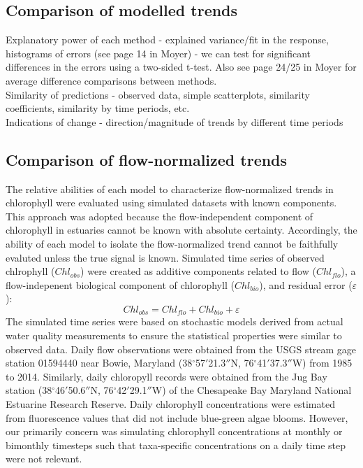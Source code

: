 \documentclass[letterpaper,12pt,oneside]{article}\usepackage[]{graphicx}\usepackage[]{color}
\begin{document}
\subsection{Comparison of modelled trends}

Explanatory power of each method - explained variance/fit in the response, histograms of errors (see page 14 in Moyer) - we can test for significant differences in the errors using a two-sided t-test.  Also see page 24/25 in Moyer for average difference comparisons between methods. \\
Similarity of predictions - observed data, simple scatterplots, similarity coefficients, similarity by time periods, etc.\\
Indications of change - direction/magnitude of trends by different time periods

\subsection{Comparison of flow-normalized trends}

The relative abilities of each model to characterize flow-normalized trends in chlorophyll were evaluated using simulated datasets with known components.  This approach was adopted because the flow-independent component of chlorophyll in estuaries cannot be known with absolute certainty.  Accordingly, the ability of each model to isolate the flow-normalized trend cannot be faithfully evaluted unless the true signal is known.  Simulated time series of observed chlrophyll ($Chl_{obs}$) were created as additive components related to flow ($Chl_{flo}$), a flow-indepenent biological component of chlorophyll ($Chl_{bio}$), and residual error ($\varepsilon$):
\begin{equation} \label{chlsim}
Chl_{obs} = Chl_{flo} + Chl_{bio} + \varepsilon
\end{equation}
The simulated time series were based on stochastic models derived from actual water quality measurements to ensure the statistical properties were similar to observed data.  Daily flow observations were obtained from the \ac{USGS} stream gage station 01594440 near Bowie, Maryland (38$^{\circ}$57$'$21.3$''$N, 76$^{\circ}$41$'$37.3$''$W) from 1985 to 2014.  Similarly, daily chloropyll records were obtained from the Jug Bay station (38$^{\circ}$46$'$50.6$''$N, 76$^{\circ}$42$'$29.1$''$W) of the Chesapeake Bay Maryland National Estuarine Research Reserve.  Daily chlorophyll concentrations were estimated from fluorescence values that did not include blue-green algae blooms.  However, our primarily concern was simulating chlorophyll concentrations at monthly or bimonthly timesteps such that taxa-specific concentrations on a daily time step were not relevant.
\end{document}
